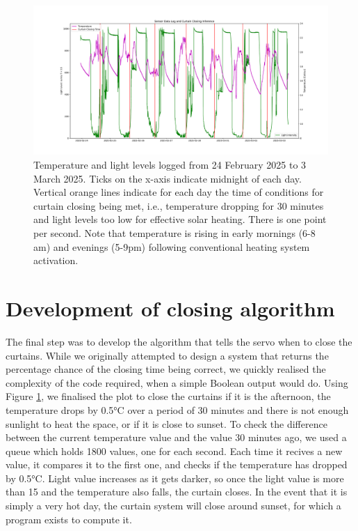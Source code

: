 \documentclass[a4paper,12pt]{article}
\begin{document}
\begin{figure}[h!]
    \includegraphics[width=\linewidth]{./figures/logDataPlot.pdf}
    \caption{Temperature and light levels logged from 24 February 2025 to 3 March 2025. Ticks on the x-axis indicate midnight of each day.
    Vertical orange lines indicate for each day the time of conditions for 
    curtain closing being met, i.e., temperature dropping for 30 minutes and light levels too low for effective solar heating. There is one point per second. 
    Note that temperature is rising in early mornings (6-8 am) and evenings (5-9pm) following conventional heating system activation. }  
    \label{fig:plot1}
  \end{figure}

\section{Development of closing algorithm}


The final step was to develop the algorithm that tells the servo when to close the curtains. 
While we originally attempted to design a system that returns the percentage chance of the closing time being correct,
we quickly realised the complexity of the code required, when a simple Boolean output would do. 
Using Figure \ref{fig:plot1}, we finalised the plot to close the curtains if it is the afternoon, 
the temperature drops by 0.5°C over a period of 30 minutes and there is not enough sunlight to heat the space, or if it is close to sunset. 
To check the difference between the current temperature value and the value 30 minutes ago, we used a queue which holds 1800 values, 
one for each second. Each time it recives a new value, it compares it to the first one, and checks if the temperature has dropped by 0.5°C.
Light value increases as it gets darker, so once the light value is more than 15 and the temperature also falls, the curtain closes.
In the event that it is simply a very hot day, the curtain system will close around sunset, for which a program exists to compute it\cite{url:sunsetEquation}.
\end{document}
